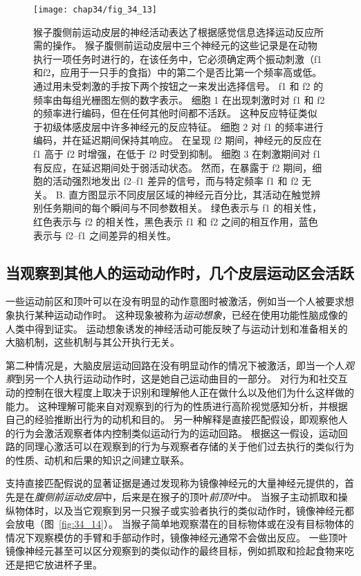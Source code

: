 \begin{figure}[htbp]
	\centering
	\texttt{[image: chap34/fig\_34\_13]}
	\caption{猴子腹侧前运动皮层的神经活动表达了根据感觉信息选择运动反应所需的操作\cite{romo2004neuronal}。
		猴子腹侧前运动皮层中三个神经元的这些记录是在动物执行一项任务时进行的，在该任务中，它必须确定两个振动刺激（f1和f2，应用于一只手的食指）中的第二个是否比第一个频率高或低。
		通过用未受刺激的手按下两个按钮之一来发出选择信号。
		f1 和 f2 的频率由每组光栅图左侧的数字表示。
		细胞 1 在出现刺激时对 f1 和 f2 的频率进行编码，但在任何其他时间都不活跃。
		这种反应特征类似于初级体感皮层中许多神经元的反应特征。
		细胞 2 对 f1 的频率进行编码，并在延迟期间保持其响应。
		在呈现 f2 期间，神经元的反应在 f1 高于 f2 时增强，在低于 f2 时受到抑制。
		细胞 3 在刺激期间对 f1 有反应，在延迟期间处于弱活动状态。
		然而，在暴露于 f2 期间，细胞的活动强烈地发出 f2–f1 差异的信号，而与特定频率 f1 和 f2 无关。
		B. 直方图显示不同皮层区域的神经元百分比，其活动在触觉辨别任务期间的每个瞬间与不同参数相关。
		绿色表示与 f1 的相关性，红色表示与 f2 的相关性，黑色表示 f1 和 f2 之间的相互作用，蓝色表示与 f2–f1 之间差异的相关性。}
	\label{fig:34_13}
\end{figure}



\subsection{当观察到其他人的运动动作时，几个皮层运动区会活跃}

一些运动前区和顶叶可以在没有明显的动作意图时被激活，例如当一个人被要求想象执行某种运动动作时。
这种现象被称为\textit{运动想象}，已经在使用功能性脑成像的人类中得到证实。
运动想象诱发的神经活动可能反映了与运动计划和准备相关的大脑机制，这些机制与其公开执行无关。


第二种情况是，大脑皮层运动回路在没有明显动作的情况下被激活，即当一个人\textit{观察}到另一个人执行运动动作时，这是她自己运动曲目的一部分。
对行为和社交互动的控制在很大程度上取决于识别和理解他人正在做什么以及他们为什么这样做的能力。
这种理解可能来自对观察到的行为的性质进行高阶视觉感知分析，并根据自己的经验推断出行为的动机和目的。
另一种解释是直接匹配假设，即观察他人的行为会激活观察者体内控制类似运动行为的运动回路。
根据这一假设，运动回路的同理心激活可以在观察到的行为与观察者存储的关于他们过去执行的类似行为的性质、动机和后果的知识之间建立联系。


支持直接匹配假说的显著证据是通过发现称为镜像神经元的大量神经元提供的，首先是在\textit{腹侧前运动皮层}中，后来是在猴子的顶叶\textit{前顶叶}中。
当猴子主动抓取和操纵物体时，以及当它观察到另一只猴子或实验者执行的类似动作时，镜像神经元都会放电（图~\ref{fig:34_14}）。
当猴子简单地观察潜在的目标物体或在没有目标物体的情况下观察模仿的手臂和手部动作时，镜像神经元通常不会做出反应。
一些顶叶镜像神经元甚至可以区分观察到的类似动作的最终目标，例如抓取和捡起食物来吃还是把它放进杯子里。


